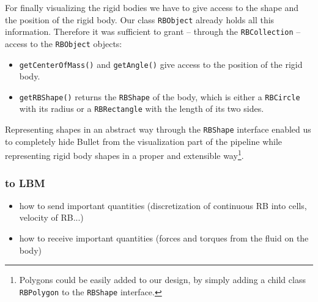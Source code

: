 For finally visualizing the rigid bodies we have to give access to the shape and the position of the rigid body. Our class \texttt{RBObject} already holds all this information. Therefore it was sufficient to grant -- through the \texttt{RBCollection} -- access to the \texttt{RBObject} objects:
\begin{itemize}
\item \texttt{getCenterOfMass()} and \texttt{getAngle()} give access to the position of the rigid body.
\item \texttt{getRBShape()} returns the \texttt{RBShape} of the body, which is either a \texttt{RBCircle} with its radius or a \texttt{RBRectangle} with the length of its two sides.
\end{itemize}
Representing shapes in an abstract way through the \texttt{RBShape} interface enabled us to completely hide Bullet from the visualization part of the pipeline while representing rigid body shapes in a proper and extensible way\footnote{Polygons could be easily added to our design, by simply adding a child class \texttt{RBPolygon} to the \texttt{RBShape} interface.}. 
\subsubsection{to LBM}
\begin{itemize}
\item how to send important quantities (discretization of continuous RB into cells, velocity of RB...)
\item how to receive important quantities (forces and torques from the fluid on the body)
\end{itemize}